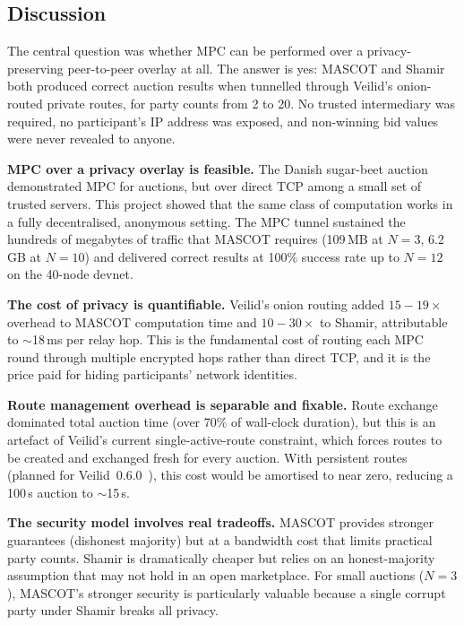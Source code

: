 \subsection{Discussion}
\label{sec:conc-discussion}

The central question was whether MPC can be performed over a
privacy-preserving peer-to-peer overlay at all.  The answer is yes: MASCOT
and Shamir both produced correct auction results when tunnelled through
Veilid's onion-routed private routes, for party counts from 2 to 20.  No
trusted intermediary was required, no participant's IP address was exposed,
and non-winning bid values were never revealed to anyone.

\textbf{MPC over a privacy overlay is feasible.}  The Danish sugar-beet
auction~\cite{bogetoft2009_mpc_live} demonstrated MPC for auctions, but over
direct TCP among a small set of trusted servers.  This project showed that the
same class of computation works in a fully decentralised, anonymous setting.
The MPC tunnel sustained the hundreds of megabytes of traffic that MASCOT
requires (109\,MB at $N{=}3$, 6.2\,GB at $N{=}10$) and delivered correct
results at 100\% success rate up to $N{=}12$ on the 40-node devnet.

\textbf{The cost of privacy is quantifiable.}  Veilid's onion routing added
$15{-}19\times$ overhead to MASCOT computation time and $10{-}30\times$ to
Shamir, attributable to ${\sim}$18\,ms per relay hop.  This is the
fundamental cost of routing each MPC round through multiple encrypted hops
rather than direct TCP, and it is the price paid for hiding participants'
network identities.

\textbf{Route management overhead is separable and fixable.}  Route exchange
dominated total auction time (over 70\% of wall-clock duration), but this is
an artefact of Veilid's current single-active-route constraint, which forces
routes to be created and exchanged fresh for every auction.  With persistent
routes (planned for Veilid~0.6.0~\cite{rioux2026_routing_overhaul}), this
cost would be amortised to near zero, reducing a 100\,s auction to
${\sim}$15\,s.

\textbf{The security model involves real tradeoffs.}  MASCOT provides stronger
guarantees (dishonest majority) but at a bandwidth cost that limits practical
party counts.  Shamir is dramatically cheaper but relies on an honest-majority
assumption that may not hold in an open marketplace.  For small auctions
($N{=}3$), MASCOT's stronger security is particularly valuable because a
single corrupt party under Shamir breaks all privacy.

